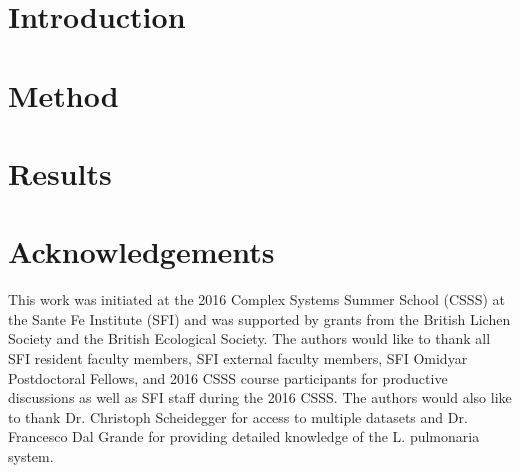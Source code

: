 \documentclass[runningheads,a4paper]{llncs}
\begin{document}
\section{Introduction}
\label{sec:methods}


\section{Method}
\label{sec:method}


\section{Results}
\label{sec:results}


\section*{Acknowledgements}
This work was initiated at the 2016 Complex Systems Summer School (CSSS) at the Sante Fe Institute (SFI) and was supported by grants from the British Lichen Society and the British Ecological Society. The authors would like to thank all SFI resident faculty members, SFI external faculty members, SFI Omidyar Postdoctoral Fellows, and 2016 CSSS course participants for productive discussions as well as SFI staff during the 2016 CSSS. The authors would also like to thank Dr. Christoph Scheidegger for access to multiple datasets and Dr. Francesco Dal Grande for providing detailed knowledge of the L. pulmonaria system. 




\end{document}
